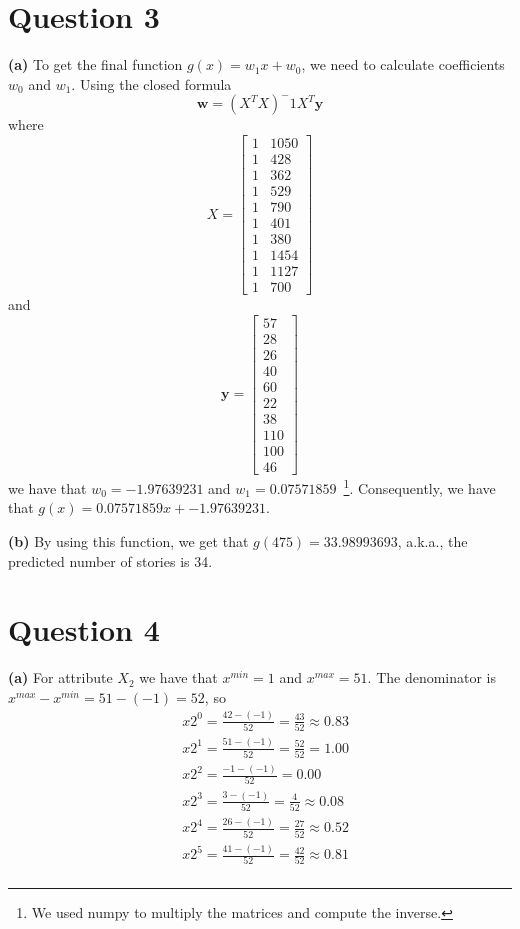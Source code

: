 \documentclass[leqno]{article}
\begin{document}
\section*{Question 3} \textbf{(a)} To get the final function $g(x) = w_1x + w_0$, we need to calculate coefficients $w_0$ and $w_1$. Using the closed 
formula
\begin{equation*}
\textbf{w} = (X^TX)^-1X^T\textbf{y}
\end{equation*}
where 
\[
X=
  \begin{bmatrix}
    1 & 1050\\
    1 & 428\\
    1 & 362\\
    1 & 529\\
    1 & 790\\
    1 & 401\\
    1 & 380\\
    1 & 1454\\
    1 & 1127\\
    1 & 700
  \end{bmatrix}
\]
and
\[
\textbf{y}=
  \begin{bmatrix}
     57\\
     28\\
     26\\
     40\\
     60\\
     22\\
     38\\
     110\\
     100\\
     46
  \end{bmatrix}
\]
we have that $w_0 = -1.97639231$ and $w_1 = 0.07571859$~\footnote{We used numpy to multiply the matrices and compute the inverse.}. Consequently,
we have that $g(x) = 0.07571859x + -1.97639231$.

\hfill

\noindent \textbf{(b)} By using this function, we get that $g(475) = 33.98993693$, a.k.a., the predicted number of stories is 34.

\hfill

\section*{Question 4} \textbf{(a)} For attribute $X_2$ we have that $x^{min} = 1$ and $x^{max} = 51$. The denominator is 
$x^{max} - x^{min} = 51 - (-1) = 52$, so
\begin{equation*}
\begin{split}
&x2^0 = \frac{42 - (-1)}{52} = \frac{43}{52} \approx 0.83 \\
&x2^1 = \frac{51 - (-1)}{52} = \frac{52}{52} = 1.00\\
&x2^2 = \frac{-1 - (-1)}{52} = 0.00\\
&x2^3 = \frac{3 - (-1)}{52} = \frac{4}{52} \approx 0.08\\
&x2^4 = \frac{26 - (-1)}{52} = \frac{27}{52} \approx 0.52\\
&x2^5 = \frac{41 - (-1)}{52} = \frac{42}{52} \approx 0.81\\ 
\end{split}
\end{equation*} 
\end{document}

